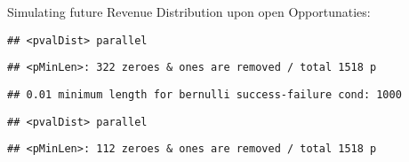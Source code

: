 \documentclass[]{article}
\newenvironment{Shaded}{\begin{snugshade}}{\end{snugshade}}
\newcommand{\DataTypeTok}[1]{\textcolor[rgb]{0.13,0.29,0.53}{#1}}
\newcommand{\DecValTok}[1]{\textcolor[rgb]{0.00,0.00,0.81}{#1}}
\newcommand{\KeywordTok}[1]{\textcolor[rgb]{0.13,0.29,0.53}{\textbf{#1}}}
\newcommand{\NormalTok}[1]{#1}
\newcommand{\OperatorTok}[1]{\textcolor[rgb]{0.81,0.36,0.00}{\textbf{#1}}}
\newcommand{\OtherTok}[1]{\textcolor[rgb]{0.56,0.35,0.01}{#1}}
\newcommand{\StringTok}[1]{\textcolor[rgb]{0.31,0.60,0.02}{#1}}
\begin{document}
Simulating future Revenue Distribution upon open Opportunaties:

\begin{Shaded}
\end{Shaded}

\begin{verbatim}
## <pvalDist> parallel
\end{verbatim}

\begin{verbatim}
## <pMinLen>: 322 zeroes & ones are removed / total 1518 p
\end{verbatim}

\begin{verbatim}
## 0.01 minimum length for bernulli success-failure cond: 1000
\end{verbatim}

\begin{Shaded}
\end{Shaded}

\begin{verbatim}
## <pvalDist> parallel
\end{verbatim}

\begin{verbatim}
## <pMinLen>: 112 zeroes & ones are removed / total 1518 p
\end{verbatim}
\end{document}
